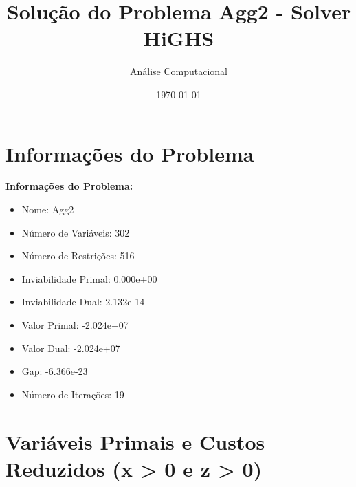 \documentclass[12pt]{article}
\title{Solução do Problema Agg2 - Solver HiGHS}
\author{Análise Computacional}
\date{\today}
\begin{document}
\maketitle

\section{Informações do Problema}

\textbf{Informações do Problema:}
\begin{itemize}
\item Nome: Agg2
\item Número de Variáveis: 302
\item Número de Restrições: 516
\item Inviabilidade Primal: 0.000e+00
\item Inviabilidade Dual: 2.132e-14
\item Valor Primal: -2.024e+07
\item Valor Dual: -2.024e+07
\item Gap: -6.366e-23
\item Número de Iterações: 19
\end{itemize}


\section{Variáveis Primais e Custos Reduzidos (x > 0 e z > 0)}
\end{document}
